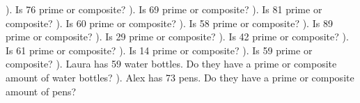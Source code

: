\documentclass{article}%
\begin{document}
\newline%
\newline%
). Is 76 prime or composite?%
\newline%
\newline%
). Is 69 prime or composite?%
\newline%
\newline%
). Is 81 prime or composite?%
\newline%
\newline%
). Is 60 prime or composite?%
\newline%
\newline%
). Is 58 prime or composite?%
\newline%
\newline%
). Is 89 prime or composite?%
\newline%
\newline%
). Is 29 prime or composite?%
\newline%
\newline%
). Is 42 prime or composite?%
\newline%
\newline%
). Is 61 prime or composite?%
\newline%
\newline%
). Is 14 prime or composite?%
\newline%
\newline%
). Is 59 prime or composite?%
\newline%
\newline%
). Laura has 59 water bottles. Do they have a prime or composite amount of water bottles?%
\newline%
\newline%
). Alex has 73 pens. Do they have a prime or composite amount of pens?%
\newline%
\newline%
\newline%
\end{document}
